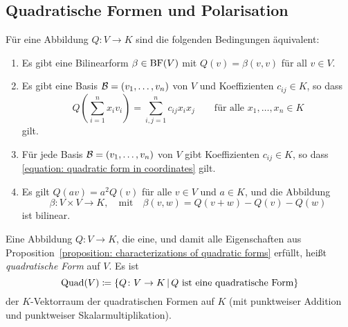 \subsection{Quadratische Formen und Polarisation}

\begin{proposition}
  \label{proposition: characterizations of quadratic forms}
  Für eine Abbildung $Q \colon V \to K$ sind die folgenden Bedingungen äquivalent:
  \begin{enumerate}
    \item
      Es gibt eine Bilinearform $\beta \in \operatorname{BF}(V)$ mit $Q(v) = \beta(v, v)$ für all $v \in V$.
    \item
      Es gibt eine Basis $\mathcal{B} = (v_1, \dotsc, v_n)$ von $V$ und Koeffizienten $c_{ij} \in K$, so dass
      \begin{equation}
        \label{equation: quadratic form in coordinates}
          Q\left( \sum_{i=1}^n x_i v_i \right)
        = \sum_{i,j=1}^n c_{ij} x_i x_j
        \qquad
        \text{für alle $x_1, \dotsc, x_n \in K$}
      \end{equation}
      gilt.
    \item
      Für jede Basis $\mathcal{B} = (v_1, \dotsc, v_n)$ von $V$ gibt Koeffizienten $c_{ij} \in K$, so dass \eqref{equation: quadratic form in coordinates} gilt.
    \item
      Es gilt $Q(av) = a^2 Q(v)$ für alle $v \in V$ und $a \in K$, und die Abbildung
      \[
                \beta
        \colon  V \times V
        \to     K,
        \quad\text{mit}\quad
          \beta(v,w)
        = Q(v + w) - Q(v) - Q(w)
      \]
      ist bilinear.
  \end{enumerate}
\end{proposition}

\begin{definition}
  Eine Abbildung $Q \colon V \to K$, die eine, und damit alle Eigenschaften aus Proposition~\ref{proposition: characterizations of quadratic forms} erfüllt, heißt \emph{quadratische Form} auf $V$.
  Es ist
  \[
              \operatorname{Quad}(V)
    \coloneqq \{ Q \colon V \to K \,|\, \text{$Q$ ist eine quadratische Form} \}
  \]
  der $K$-Vektorraum der quadratischen Formen auf $K$ (mit punktweiser Addition und punktweiser Skalarmultiplikation).
\end{definition}

